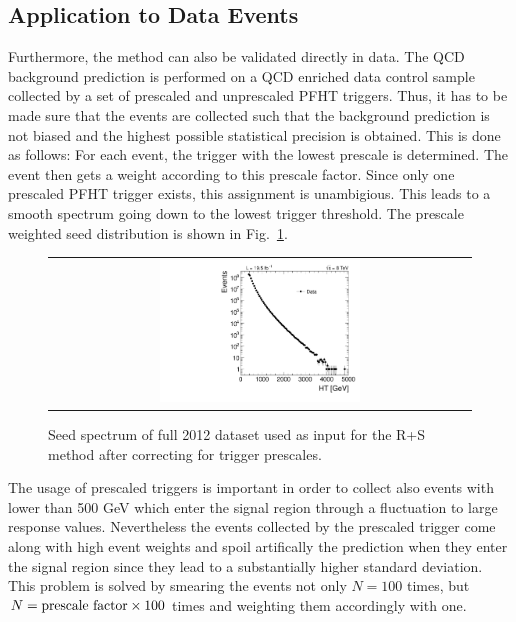 \subsection{Application to Data Events}
\label{subsec:validation_data_R+S}
Furthermore, the method can also be validated directly in data. The QCD background prediction is performed on a QCD enriched data control sample collected by a set of prescaled and unprescaled PFHT triggers. Thus, it has to be made sure that the events are collected such that the background prediction is not biased and the highest possible statistical precision is obtained. This is done as follows: For each event, the trigger with the lowest prescale is determined. The event then gets a weight according to this prescale factor. Since only one prescaled PFHT trigger exists, this assignment is unambigious. This leads to a smooth \HT spectrum going down to the lowest trigger threshold. The prescale weighted seed \HT distribution is shown in Fig.~\ref{fig:qcd_rs_seedht}.
\begin{figure}[!t]
  \centering
  \begin{tabular}{c}
                \includegraphics[width=0.49\textwidth]{figures/HT_data.pdf}
  \end{tabular}
  \caption{Seed \HT spectrum of full 2012 dataset used as input for the R+S method after correcting for trigger prescales.}
  \label{fig:qcd_rs_seedht}
\end{figure}
The usage of prescaled triggers is important in order to collect also events with \HT lower than 500 GeV which enter the signal region through a fluctuation to large response values. Nevertheless the events collected by the prescaled trigger come along with high event weights and spoil artifically the prediction when they enter the signal region since they lead to a substantially higher standard deviation. This problem is solved by smearing the events not only $N = 100$ times, but $N = \rm{prescale~factor} \times 100$ times and weighting them accordingly with one.\\
\\

